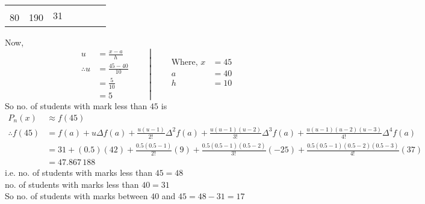 \documentclass[12pt,class=book,crop=false]{standalone}
\begin{document}
\begin{soln}
\begin{center}
\begin{tabular}{ccccccc}
                    &            & \multirow{2}{*}{31} &                      &                      &                     &                     \\
            80      & 190        &                     &                      &                      &                     &                     \\ \bottomrule
        \end{tabular}
    \end{center}
    Now,\[\left.\begin{aligned}
            u            & =\frac{x-a}{h}    \\
            \therefore u & =\frac{45-40}{10} \\
                         & =\frac{5}{10}     \\
                         & =5
        \end{aligned}\qquad\right|\qquad\begin{aligned}
            \text{Where, } x & =45 \\
            a                & =40 \\
            h                & =10 \\
        \end{aligned}\]
    So no. of students with mark less than \( 45  \) is
    \begin{align*}
        P_n(x)           & \approx f(45)                                                                                                                     \\
        \therefore f(45) & =f(a)+u\Delta f(a)+\frac{u(u-1)}{2!\,}\Delta^2f(a)+\frac{u(u-1)(u-2)}{3!\,}\Delta^3f(a)+\frac{u(u-1)(u-2)(u-3)}{4!\,}\Delta^4f(a) \\
                         & =31+(0.5)(42)+\frac{0.5(0.5-1)}{2!\,}(9)+\frac{0.5(0.5-1)(0.5-2)}{3!\,}(-25)+\frac{0.5(0.5-1)(0.5-2)(0.5-3)}{4!\,}(37)            \\
                         & =47.867\,188
    \end{align*}
    i.e. no. of students with marks less than \( 45=48 \)\\
    no. of students with marks less than \( 40=31 \)\\
    So no. of students with marks between \( 40 \) and \( 45=48-31=17 \)
\end{soln}
\end{document}

